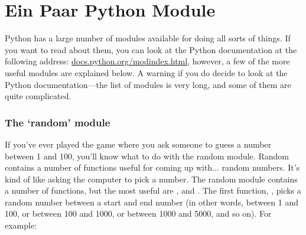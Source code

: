 

\chapter{Ein Paar Python Module}\label{app:afewpythonmodules}

Python has a large number of modules available for doing all sorts of things.  If you want to read about them, you can look at the Python documentation at the following address: \href{http://docs.python.org/modindex.html}{docs.python.org/modindex.html}, however, a few of the more useful modules are explained below.  A warning if you do decide to look at the Python documentation---the list of modules is very long, and some of them are quite complicated.

\subsection*{The `random' module}

If you've ever played the game where you ask someone to guess a number between 1 and 100, you'll know what to do with the random module.  Random contains a number of functions useful for coming up with$\ldots$ random numbers. It's kind of like asking the computer to pick a number. The random module contains a number of functions, but the most useful are ,  and . The first function, ,  picks a random number between a start and end number (in other words, between 1 and 100, or between 100 and 1000, or between 1000 and 5000, and so on).  For example:


